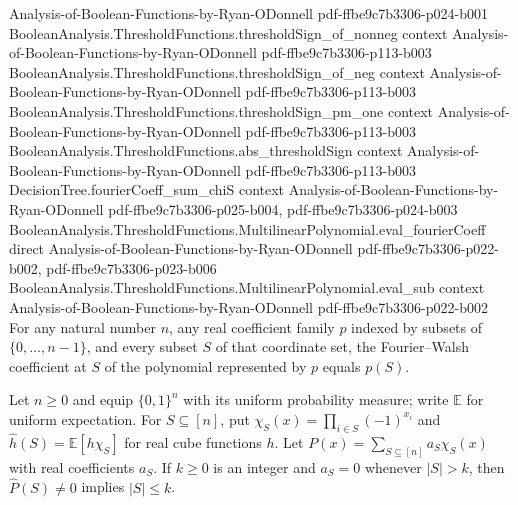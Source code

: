 \begin{lemma}
  {Analysis-of-Boolean-Functions-by-Ryan-ODonnell}
  {pdf-ffbe9c7b3306-p024-b001}
\proofstep
  {BooleanAnalysis.ThresholdFunctions.thresholdSign_of_nonneg}
  {context}
  {Analysis-of-Boolean-Functions-by-Ryan-ODonnell}
  {pdf-ffbe9c7b3306-p113-b003}
\proofstep
  {BooleanAnalysis.ThresholdFunctions.thresholdSign_of_neg}
  {context}
  {Analysis-of-Boolean-Functions-by-Ryan-ODonnell}
  {pdf-ffbe9c7b3306-p113-b003}
\proofstep
  {BooleanAnalysis.ThresholdFunctions.thresholdSign_pm_one}
  {context}
  {Analysis-of-Boolean-Functions-by-Ryan-ODonnell}
  {pdf-ffbe9c7b3306-p113-b003}
\proofstep
  {BooleanAnalysis.ThresholdFunctions.abs_thresholdSign}
  {context}
  {Analysis-of-Boolean-Functions-by-Ryan-ODonnell}
  {pdf-ffbe9c7b3306-p113-b003}
\proofstep
  {DecisionTree.fourierCoeff_sum_chiS}
  {context}
  {Analysis-of-Boolean-Functions-by-Ryan-ODonnell}
  {pdf-ffbe9c7b3306-p025-b004,
    pdf-ffbe9c7b3306-p024-b003}
\proofstep
  {BooleanAnalysis.ThresholdFunctions.MultilinearPolynomial.eval_fourierCoeff}
  {direct}
  {Analysis-of-Boolean-Functions-by-Ryan-ODonnell}
  {pdf-ffbe9c7b3306-p022-b002,
    pdf-ffbe9c7b3306-p023-b006}
\proofstep
  {BooleanAnalysis.ThresholdFunctions.MultilinearPolynomial.eval_sub}
  {context}
  {Analysis-of-Boolean-Functions-by-Ryan-ODonnell}
  {pdf-ffbe9c7b3306-p022-b002}
For any natural number $n$, any real coefficient family $p$ indexed by subsets of
$\{0,\ldots,n-1\}$, and every subset $S$ of that coordinate set, the Fourier--Walsh
coefficient at $S$ of the polynomial represented by $p$ equals $p(S)$.
\end{lemma}

\begin{lemma}
\leanok
{}
Let $n\ge0$ and equip $\{0,1\}^n$ with its uniform probability measure; write $\mathbb E$ for uniform expectation. For $S\subseteq[n]$, put $\chi_S(x)=\prod_{i\in S}(-1)^{x_i}$ and $\widehat h(S)=\mathbb E[h\chi_S]$ for real cube functions $h$. Let $P(x)=\sum_{S\subseteq[n]}a_S\chi_S(x)$ with real coefficients $a_S$. If $k\ge0$ is an integer and $a_S=0$ whenever $|S|>k$, then $\widehat P(S)\ne0$ implies $|S|\le k$.
\end{lemma}

